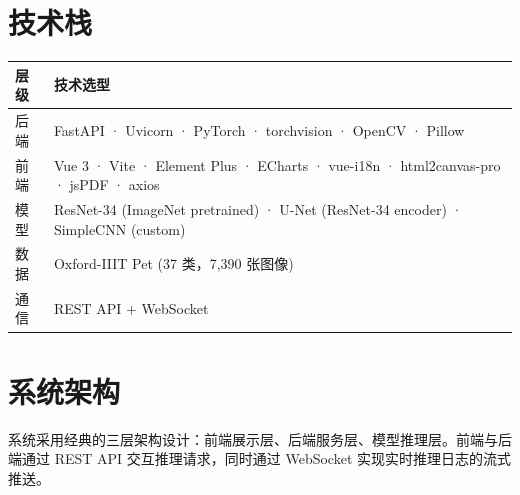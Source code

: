 \documentclass[12pt, a4paper, openany]{ctexbook}
\begin{document}
\section{技术栈}

\begin{center}
\begin{tabular}{lL{9cm}}
  \toprule
  \textbf{层级} & \textbf{技术选型} \\
  \midrule
  后端 & FastAPI · Uvicorn · PyTorch · torchvision · OpenCV · Pillow \\
  前端 & Vue 3 · Vite · Element Plus · ECharts · vue-i18n · html2canvas-pro · jsPDF · axios \\
  模型 & ResNet-34 (ImageNet pretrained) · U-Net (ResNet-34 encoder) · SimpleCNN (custom) \\
  数据 & Oxford-IIIT Pet (37 类，7{,}390 张图像) \\
  通信 & REST API + WebSocket \\
  \bottomrule
\end{tabular}
\end{center}

\section{系统架构}

系统采用经典的三层架构设计：前端展示层、后端服务层、模型推理层。前端与后端通过
REST API 交互推理请求，同时通过 WebSocket 实现实时推理日志的流式推送。
\end{document}
